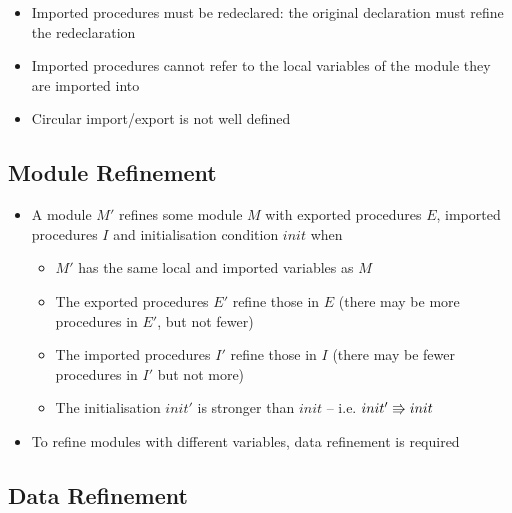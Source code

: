 \begin{itemize}
\begin{itemize}
\begin{itemize}
			\item Imported procedures must be redeclared: the original declaration must refine the redeclaration
			
			\item Imported procedures cannot refer to the local variables of the module they are imported into
			
			\item Circular import/export is not well defined
			
		\end{itemize}
		
	\end{itemize}
	
\end{itemize}

\subsection{Module Refinement}

\begin{itemize}
	
	\item A module $ M' $ refines some module $ M $ with exported procedures $ E $, imported procedures $ I $ and initialisation condition $ init $ when
	
	\begin{itemize}
		
		\item $ M' $ has the same local and imported variables as $ M $
		
		\item The exported procedures $ E' $ refine those in $ E $ (there may be more procedures in $ E' $, but not fewer)
		
		\item The imported procedures $ I' $ refine those in $ I $ (there may be fewer procedures in $ I' $ but not more)
		
		\item The initialisation $ init' $ is stronger than $ init $ -- i.e. $ init' \Rrightarrow init $
		
	\end{itemize}
	
	\item To refine modules with different variables, data refinement is required
	
\end{itemize}

\newpage

\subsection{Data Refinement}

